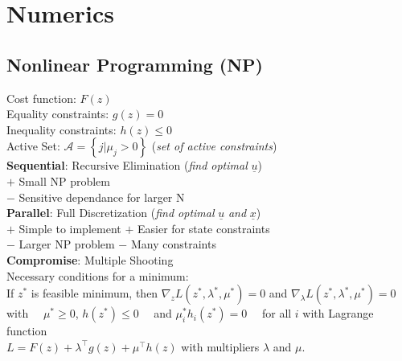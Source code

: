 \documentclass[english]{latex4ei/latex4ei_sheet}
\begin{document}
\section{Numerics}
\begin{sectionbox}

\subsection{Nonlinear Programming (NP)}
Cost function: $F(z)$\\
Equality constraints: $g(z)=0$\\
Inequality constraints: $h(z)\leq 0$\\
Active Set: $\mathcal{A}=\left\{j | \mu_{j}>0\right\}$ (\textit{set of active constraints})
\vspace{0.1cm}\\
\textbf{Sequential}: Recursive Elimination (\textit{find optimal} $\underline{u}$)\\
$+$ Small NP problem\\
$-$ Sensitive dependance for larger N
\vspace{0.1cm}\\
\textbf{Parallel}: Full Discretization (\textit{find optimal} $\underline{u}$ \textit{and} $\underline{x}$)\\
$+$ Simple to implement \qquad $+$ Easier for state constraints\\
$-$ Larger NP problem \; \qquad $-$ Many constraints
\vspace{0.1cm}\\
\textbf{Compromise}: Multiple Shooting
\vspace{0.1cm}\\
Necessary conditions for a minimum:\\
If $z^{*}$ is feasible minimum, then $\nabla_{z} L\left(z^{*}, \lambda^{*}, \mu^{*}\right)=0$ and $\nabla_{\lambda} L\left(z^{*}, \lambda^{*}, \mu^{*}\right)=0\quad$ with $\quad\mu^{*} \geq 0$, $h\left(z^{*}\right) \leq 0\quad$ and $\mu_{i}^{*} h_{i}\left(z^{*}\right)=0\quad$ for all $i$ with Lagrange function\\ $L=F(z)+\lambda^{\top} g(z)+\mu^{\top} h(z)$ with multipliers $\lambda$ and $\mu$.\\


\end{sectionbox}
\end{document}
